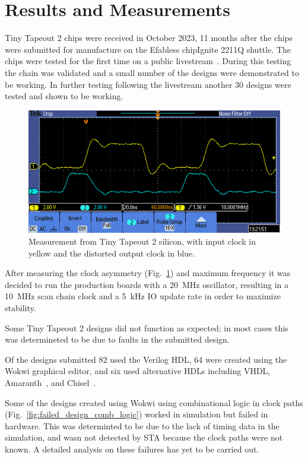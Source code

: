 \section{Results and Measurements}
\label{sec:results}

Tiny Tapeout 2 chips were received in October 2023, 11 months after the chips were submitted for manufacture on the Efabless chipIgnite 2211Q shuttle.
The chips were tested for the first time on a public livestream~\cite{siliconalive}.
During this testing the chain was validated and a small number of the designs were demonstrated to be working.
In further testing following the livestream another 30 designs were tested and shown to be working.

\begin{figure}[!t]
\centering
\includegraphics[width=\columnwidth]{./Figs/tt02_clock_out.png}
\caption{Measurement from Tiny Tapeout 2 silicon, with input clock in yellow and the distorted output clock in blue.}
\label{fig:TT02_clock_out}
\end{figure}

After measuring the clock asymmetry (Fig.~\ref{fig:TT02_clock_out}) and maximum frequency it was decided to run the production boards with a \qty{20}{\MHz} oscillator, resulting in a \qty{10}{\MHz} scan chain clock and a \qty{5}{\kHz} IO update rate in order to maximize stability.

Some Tiny Tapeout 2 designs did not function as expected; in most cases this was determineted to be due to faults in the submitted design.

Of the designs submitted 82 used the Verilog HDL, 64 were created using the Wokwi graphical editor, and six used alternative HDLs including VHDL, Amaranth~\cite{amaranth}, and Chisel~\cite{chisel}.

Some of the designs created using Wokwi using combinational logic in clock paths (Fig.~\ref{fig:failed_design_comb_logic}) worked in simulation but failed in hardware.
This was determinted to be due to the lack of timing data in the simulation, and wasn not detected by STA because the clock paths were not known. A detailed analysis on these failures has yet to be carried out.

